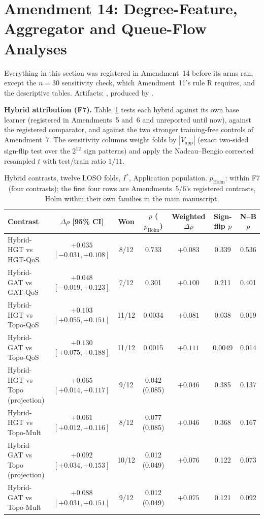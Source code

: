 \section{Amendment 14: Degree-Feature, Aggregator and Queue-Flow Analyses}
\label{supp:round8}

Everything in this section was registered in Amendment~14 before its arms ran, except the $n = 30$ sensitivity check, which Amendment~11's rule R requires, and the descriptive tables. Artifacts: , produced by .

\noindent\textbf{Hybrid attribution (F7).} Table~\ref{tab:r8-hybrid} tests each hybrid against its own base learner (registered in Amendments~5 and~6 and unreported until now), against the registered comparator, and against the two stronger training-free controls of Amendment~7. The sensitivity columns weight folds by $|V_{\text{app}}|$ (exact two-sided sign-flip test over the $2^{12}$ sign patterns) and apply the Nadeau--Bengio corrected resampled $t$ with test/train ratio $1/11$.

\begin{table}[htbp]
\centering
\scriptsize
\caption{Hybrid contrasts, twelve LOSO folds, $I^*$, Application population. $p_{\text{Holm}}$: within F7 (four contrasts); the first four rows are Amendments~5/6's registered contrasts, Holm within their own families in the main manuscript.}
\label{tab:r8-hybrid}
\begin{tabular}{lcccccc}
\toprule
Contrast & $\Delta\rho$ [95\% CI] & Won & $p$ ($p_{\text{Holm}}$) & Weighted $\Delta\rho$ & Sign-flip $p$ & N--B $p$ \\
\midrule
Hybrid-HGT vs HGT-QoS & $+0.035$ $[-0.031, +0.108]$ & 8/12 & 0.733 & $+0.083$ & 0.339 & 0.536 \\
Hybrid-GAT vs GAT-QoS & $+0.048$ $[-0.019, +0.123]$ & 7/12 & 0.301 & $+0.100$ & 0.211 & 0.401 \\
Hybrid-HGT vs Topo-QoS & $+0.103$ $[+0.055, +0.151]$ & 11/12 & 0.0034 & $+0.081$ & 0.038 & 0.019 \\
Hybrid-GAT vs Topo-QoS & $+0.130$ $[+0.075, +0.188]$ & 11/12 & 0.0015 & $+0.111$ & 0.0049 & 0.014 \\
Hybrid-HGT vs Topo (projection) & $+0.065$ $[+0.014, +0.117]$ & 9/12 & 0.042 (0.085) & $+0.046$ & 0.385 & 0.137 \\
Hybrid-HGT vs Topo-Mult & $+0.061$ $[+0.012, +0.116]$ & 8/12 & 0.077 (0.085) & $+0.046$ & 0.368 & 0.167 \\
Hybrid-GAT vs Topo (projection) & $+0.092$ $[+0.034, +0.153]$ & 10/12 & 0.012 (0.049) & $+0.076$ & 0.122 & 0.073 \\
Hybrid-GAT vs Topo-Mult & $+0.088$ $[+0.031, +0.151]$ & 9/12 & 0.012 (0.049) & $+0.075$ & 0.121 & 0.092 \\
\bottomrule
\end{tabular}
\end{table}

